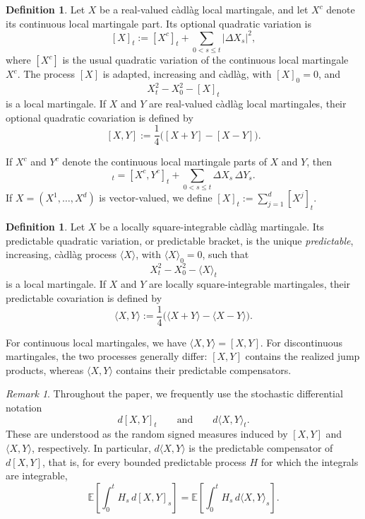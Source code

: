 \documentclass[11pt]{amsart}
\theoremstyle{definition}
\newtheorem{definition}[theorem]{Definition}
\theoremstyle{remark}
\newtheorem{remark}[theorem]{Remark}
\numberwithin{equation}{section}
\begin{document}
\begin{definition}
Let $X$ be a real-valued c\`adl\`ag local martingale, and let $X^c$ denote its continuous local martingale part. Its optional quadratic variation is
\[
[X]_t:=[X^c]_t+\sum_{0<s\leq t}|\Delta X_s|^2,
\]
where $[X^c]$ is the usual quadratic variation of the continuous local martingale $X^c$. The process $[X]$ is adapted, increasing and c\`adl\`ag, with $[X]_0=0$, and
\[
X_t^2-X_0^2-[X]_t
\]
is a local martingale. If $X$ and $Y$ are real-valued c\`adl\`ag local
martingales, their optional quadratic covariation is defined by
\[
[X,Y]
:=
\frac14\bigl([X+Y]-[X-Y]\bigr).
\]
\end{definition}

If $X^c$ and $Y^c$ denote the continuous local martingale parts of
$X$ and $Y$, then
\begin{equation}
[X,Y]_t
=
[X^c,Y^c]_t
+
\sum_{0<s\leq t}
\Delta X_s\,\Delta Y_s.
\label{eq:optional-covariation-decomposition}
\end{equation}
If $X=(X^1,\ldots,X^d)$ is vector-valued, we define
$[X]_t:=\sum_{j=1}^d[X^j]_t$.

\begin{definition}
Let $X$ be a locally square-integrable c\`adl\`ag martingale. Its
predictable quadratic variation, or predictable bracket, is the unique
\emph{predictable}, increasing, c\`adl\`ag process $\langle X\rangle$, with
$\langle X\rangle_0=0$, such that
\[
X_t^2-X_0^2-\langle X\rangle_t
\]
is a local martingale. If $X$ and $Y$ are locally square-integrable
martingales, their predictable covariation is defined by
\[
\langle X,Y\rangle
:=
\frac14
\bigl(
\langle X+Y\rangle
-
\langle X-Y\rangle
\bigr).
\]
\end{definition}
For continuous local martingales, we have $\langle X,Y\rangle=[X,Y]$.
For discontinuous martingales, the two processes generally differ:
$[X,Y]$ contains the realized jump products, whereas
$\langle X,Y\rangle$ contains their predictable compensators.

\begin{remark}
Throughout the paper, we frequently use the stochastic differential
notation
\[
d[X,Y]_t
\qquad\text{and}\qquad
d\langle X,Y\rangle_t.
\]
These are understood as the random signed measures induced by $[X,Y]$ and $\langle X,Y\rangle$, respectively. In particular, $d\langle X,Y\rangle$ is the predictable
compensator of $d[X,Y]$, that is, for every bounded predictable
process $H$ for which the integrals are integrable,
\begin{equation}
\mathbb E\left[
\int_0^t H_s\,d[X,Y]_s
\right]
=
\mathbb E\left[
\int_0^t H_s\,d\langle X,Y\rangle_s
\right].
\end{equation}
\end{remark}
\end{document}
